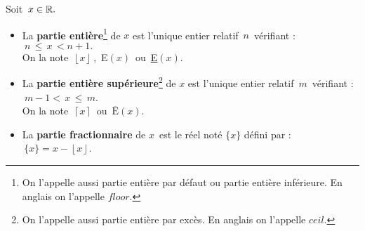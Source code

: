 \vspace{1.3cm}

\noindent Soit \(\,x\in\mathbb{R}.\)\vspace{-0.2cm}
\begin{itemize}[leftmargin=1cm,label=•]
    \item La \textbf{partie entière}\footnote{On l'appelle aussi partie entière par défaut ou partie entière inférieure. En anglais on l'appelle $floor$.} de $x$ est l'unique entier relatif $\,n\,$ vérifiant : \(\ n\,\leq \,x\,< n+1.\)\vspace{0.1cm}\\
    On la note \(\,\left\lfloor x\right\rfloor \,\), \,E$(x)\,$ ou\, \underline{E}$(x)$.\vspace{0.1cm}
    
    \item La \textbf{partie entière supérieure}\footnote{On l'appelle aussi partie entière par excès. En anglais on l'appelle $ceil$.} de $x$ est l'unique entier relatif $\,m\,$ vérifiant : \(\ m-1<\,x\,\leq \,m\).\vspace{0.1cm}\\
    On la note \(\,\left\lceil x\right\rceil\, \) ou $\,\overline{\text{E}}(x)$.\vspace{0.1cm}

    \item La \textbf{partie fractionnaire} de $x\,$ est le réel noté \(\{x\}\) défini par : \(\,\{x\}=x-\left\lfloor x\right\rfloor \).
\end{itemize}

\vspace{1.3cm}

